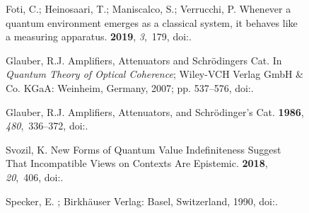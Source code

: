 \documentclass[entropy,article,accept,oneauthor,pdftex]{Definitions/mdpi}
\begin{document}
\begin{figure}[H]
\begin{thebibliography}{999}
Foti, C.; Heinosaari, T.; Maniscalco, S.; Verrucchi, P.
\newblock Whenever a quantum environment emerges as a classical system, it
  behaves like a measuring apparatus.
 {\bf 2019}, {\em 3},~179, doi:{\href{https://doi.org/10.22331/q-2019-08-26-179}{}}.

Glauber, R.J. Amplifiers, Attenuators and {S}chr\"odingers Cat.
\newblock In {\em Quantum Theory of Optical Coherence}; Wiley-VCH Verlag GmbH
  \& Co. KGaA: Weinheim, Germany, 2007; pp. 537--576, doi:{\href{https://doi.org/10.1002/9783527610075.ch14}{}}.

Glauber, R.J.
\newblock Amplifiers, Attenuators, and Schr\"odinger's Cat.
 {\bf 1986}, {\em 480},~336--372, doi:{\href{https://doi.org/10.1111/j.1749-6632.1986.tb12437.x}{}}.


Svozil, K.
\newblock New Forms of Quantum Value Indefiniteness Suggest That Incompatible
  Views on Contexts Are Epistemic.
 {\bf 2018}, {\em 20},~406, doi:{\href{https://doi.org/10.3390/e20060406}{}}.


Specker, E.
; Birkh{\"{a}}user Verlag: Basel, Switzerland, 1990, doi:{\href{https://doi.org/10.1007/978-3-0348-9259-9}{}}.


\end{thebibliography}
\end{figure}
\end{document}
